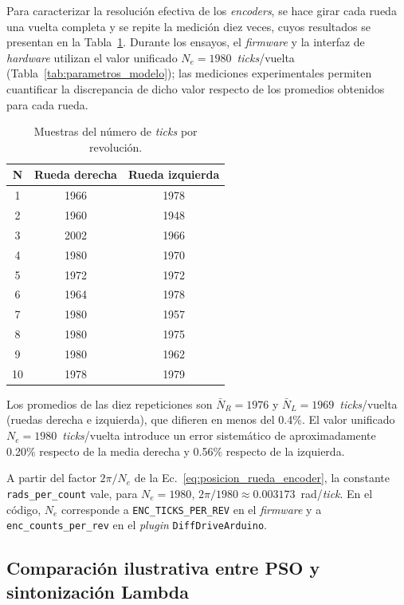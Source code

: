 \begin{appendices}
Para caracterizar la resolución efectiva de los \textit{encoders}, se hace girar cada
rueda una vuelta completa y se repite la medición diez veces, cuyos resultados
se presentan en la Tabla~\ref{tab:anx_muestras_cuentas}. Durante los
ensayos, el \textit{firmware} y la interfaz de \textit{hardware} utilizan el valor unificado
$N_e=1980$~\textit{ticks}/vuelta (Tabla~\ref{tab:parametros_modelo}); las mediciones
experimentales permiten cuantificar la discrepancia de dicho valor respecto
de los promedios obtenidos para cada rueda.

\begin{table}[H]
\centering
\caption{Muestras del número de \textit{ticks} por revolución.}
\label{tab:anx_muestras_cuentas}
\small
\begin{tabular}{ccc}
\toprule
\textbf{N} & \textbf{Rueda derecha} & \textbf{Rueda izquierda} \\
\midrule
1 & 1966 & 1978 \\
2 & 1960 & 1948 \\
3 & 2002 & 1966 \\
4 & 1980 & 1970 \\
5 & 1972 & 1972 \\
6 & 1964 & 1978 \\
7 & 1980 & 1957 \\
8 & 1980 & 1975 \\
9 & 1980 & 1962 \\
10 & 1978 & 1979 \\
\bottomrule
\end{tabular}
\end{table}

Los promedios de las diez repeticiones son $\bar{N}_R=1976$ y $\bar{N}_L=1969$~\textit{ticks}/vuelta (ruedas derecha e izquierda), que difieren en menos del 0.4\%. El valor unificado $N_e=1980$~\textit{ticks}/vuelta introduce un error sistemático de aproximadamente 0.20\% respecto de la media derecha y 0.56\% respecto de la izquierda.

A partir del factor $2\pi/N_e$ de la Ec.~\eqref{eq:posicion_rueda_encoder}, la constante \texttt{rads\_per\_count} vale, para $N_e=1980$, $2\pi/1980\approx0.003173$~rad/\textit{tick}. En el código, $N_e$ corresponde a \texttt{ENC\_TICKS\_PER\_REV} en el \textit{firmware} y a \texttt{enc\_counts\_per\_rev} en el \textit{plugin} \texttt{DiffDriveArduino}.

\subsection{Comparación ilustrativa entre PSO y sintonización Lambda}
\label{anx:comparacion_pso_lambda}
\label{anx:lambda_detalle}


\end{appendices}
